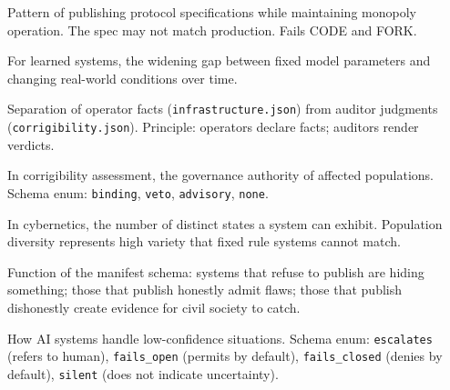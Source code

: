 \documentclass[11pt,a4paper]{article}
\begin{document}
\begin{description}[style=nextline, leftmargin=2cm]
\item[Spec-as-Source] Pattern of publishing protocol specifications while maintaining monopoly operation. The spec may not match production. Fails CODE and FORK.

\item[Temporal Variety Gap] For learned systems, the widening gap between fixed model parameters and changing real-world conditions over time.

\item[Two-Manifest Architecture] Separation of operator facts (\texttt{infrastructure.json}) from auditor judgments (\texttt{corrigibility.json}). Principle: operators declare facts; auditors render verdicts.

\item[User Power] In corrigibility assessment, the governance authority of affected populations. Schema enum: \texttt{binding}, \texttt{veto}, \texttt{advisory}, \texttt{none}.

\item[Variety] In cybernetics, the number of distinct states a system can exhibit. Population diversity represents high variety that fixed rule systems cannot match.

\item[Warrant Canary] Function of the manifest schema: systems that refuse to publish are hiding something; those that publish honestly admit flaws; those that publish dishonestly create evidence for civil society to catch.

\item[When Uncertain] How AI systems handle low-confidence situations. Schema enum: \texttt{escalates} (refers to human), \texttt{fails\_open} (permits by default), \texttt{fails\_closed} (denies by default), \texttt{silent} (does not indicate uncertainty).

\end{description}
\end{document}
